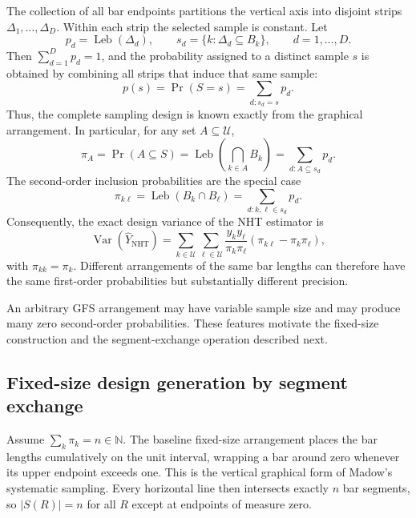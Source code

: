 \documentclass[twoside]{article}
\newcommand{\U}{\mathcal{U}}
\newcommand{\Sample}{S}
\newcommand{\NHT}{\mathrm{NHT}}
\newcommand{\Var}{\operatorname{Var}}
\newcommand{\pr}{\operatorname{Pr}}
\newcommand{\Leb}{\operatorname{Leb}}
\begin{document}
The collection of all bar endpoints partitions the vertical axis into disjoint
strips $\Delta_1,\ldots,\Delta_D$. Within each strip the selected sample is
constant. Let
\[
    p_d=\Leb(\Delta_d),\qquad
    s_d=\{k:\Delta_d\subseteq B_k\},\qquad d=1,\ldots,D.
\]
Then $\sum_{d=1}^D p_d=1$, and the probability assigned to a distinct sample
$s$ is obtained by combining all strips that induce that same sample:
\begin{equation}\label{eq:design-law}
    p(s)=\pr(\Sample=s)=\sum_{d:s_d=s}p_d.
\end{equation}
Thus, the complete sampling design is known exactly from the graphical
arrangement. In particular, for any set $A\subseteq\U$,
\begin{equation}\label{eq:higher-order}
    \pi_A=\pr(A\subseteq\Sample)
    =\Leb\!\left(\bigcap_{k\in A}B_k\right)
    =\sum_{d:A\subseteq s_d}p_d.
\end{equation}
The second-order inclusion probabilities are the special case
\begin{equation}\label{eq:sip}
    \pi_{k\ell}=\Leb(B_k\cap B_\ell)
    =\sum_{d:k,\ell\in s_d}p_d.
\end{equation}
Consequently, the exact design variance of the NHT estimator is
\begin{equation}\label{eq:nhtvar}
    \Var(\widehat Y_{\NHT})
    =
    \sum_{k\in\U}\sum_{\ell\in\U}
    \frac{y_k y_\ell}{\pi_k\pi_\ell}
    \left(\pi_{k\ell}-\pi_k\pi_\ell\right),
\end{equation}
with $\pi_{kk}=\pi_k$. Different arrangements of the same bar lengths can
therefore have the same first-order probabilities but substantially different
precision.

An arbitrary GFS arrangement may have variable sample size and may produce many
zero second-order probabilities. These features motivate the fixed-size
construction and the segment-exchange operation described next.

\subsection{Fixed-size design generation by segment exchange}

Assume $\sum_k\pi_k=n\in\mathbb{N}$. The baseline fixed-size arrangement places
the bar lengths cumulatively on the unit interval, wrapping a bar around zero
whenever its upper endpoint exceeds one. This is the vertical graphical form of
Madow's systematic sampling. Every horizontal line then intersects exactly
$n$ bar segments, so $|\Sample(R)|=n$ for all $R$ except at endpoints of measure
zero.
\end{document}
